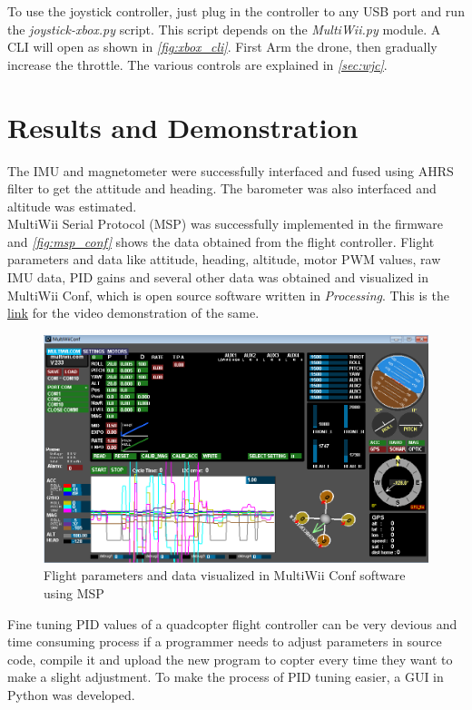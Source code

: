 \documentclass[a4paper,12pt,oneside]{book}
\begin{document}
{To use the joystick controller, just plug in the controller to any USB port and run the \textit{joystick-xbox.py} script. This script depends on the \textit{MultiWii.py} module. A CLI will open as shown in \textit{\autoref{fig:xbox_cli}}. First Arm the drone, then gradually increase the throttle. The various controls are explained in \textit{\autoref{sec:wjc}}.

\section{Results and Demonstration}
The IMU and magnetometer were successfully interfaced and fused using AHRS filter to get the attitude and heading. The barometer was also interfaced and altitude was estimated.\\

MultiWii Serial Protocol (MSP) was successfully implemented in the firmware and \textit{\autoref{fig:msp_conf}} shows the data obtained from the flight controller. Flight parameters and data like attitude, heading, altitude, motor PWM values, raw IMU data, PID gains and several other data was obtained and visualized in MultiWii Conf, which is open source software written in \textit{Processing}. This is the \href{https://youtu.be/W6h0ePuQfjE}{link} for the video demonstration of the same.\\

\begin{figure}[!htb]
\centering
\includegraphics[width=\textwidth]{images/msp_conf}
\caption{Flight parameters and data visualized in MultiWii Conf software using MSP}
\label{fig:msp_conf}
\end{figure}

\bigskip

Fine tuning PID values of a quadcopter flight controller can be very devious and time consuming process if a programmer needs to adjust parameters in source code, compile it and upload the new program to copter every time they want to make a slight adjustment. To make the process of PID tuning easier, a GUI in Python was developed.\\

}
\end{document}

